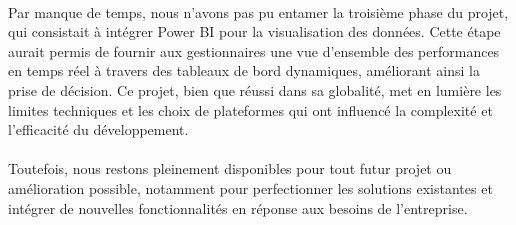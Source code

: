 \documentclass[a4paper, oneside, 12pt, final]{extreport}
\begin{document}
\\
Par manque de temps, nous n'avons pas pu entamer la troisième phase du projet, qui consistait à intégrer Power BI pour la visualisation des données. Cette étape aurait permis de fournir aux gestionnaires une vue d'ensemble des performances en temps réel à travers des tableaux de bord dynamiques, améliorant ainsi la prise de décision. Ce projet, bien que réussi dans sa globalité, met en lumière les limites techniques et les choix de plateformes qui ont influencé la complexité et l'efficacité du développement.
\\
\\
Toutefois, nous restons pleinement disponibles pour tout futur projet ou amélioration possible, notamment pour perfectionner les solutions existantes et intégrer de nouvelles fonctionnalités en réponse aux besoins de l’entreprise.

\nocite{*}







%



\cleardoublepage%


\printglossaries
\printindex
\end{document}
